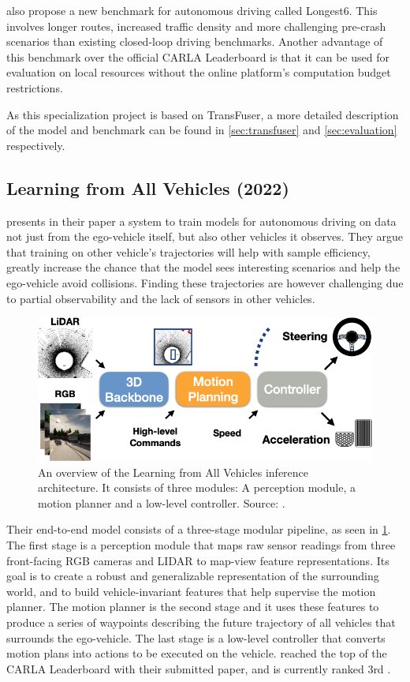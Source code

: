 \textcite{transfuser-pami} also propose a new benchmark for autonomous driving called Longest6. This involves longer routes, increased traffic density and more challenging pre-crash scenarios than existing closed-loop driving benchmarks. Another advantage of this benchmark over the official CARLA Leaderboard is that it can be used for evaluation on local resources without the online platform's computation budget restrictions.

As this specialization project is based on TransFuser, a more detailed description of the model and benchmark can be found in \cref{sec:transfuser} and \cref{sec:evaluation} respectively.


\subsection{Learning from All Vehicles (2022)}
\textcite{chen2022lav} presents in their paper a system to train models for autonomous driving on data not just from the ego-vehicle itself, but also other vehicles it observes.
They argue that training on other vehicle's trajectories will help with sample efficiency, greatly increase the chance that the model sees interesting scenarios and help the ego-vehicle avoid collisions. Finding these trajectories are however challenging due to partial observability and the lack of sensors in other vehicles.

\begin{figure}[htbp]
    \centering
    \includegraphics[width=.7\textwidth]{chapters/2-background/figures/lav.png}
    \caption{An overview of the Learning from All Vehicles inference architecture. It consists of three modules: A perception module, a motion planner and a low-level controller. Source: \cite{chen2022lav}.}
    \label{fig:lav}
\end{figure}

Their end-to-end model consists of a three-stage modular pipeline, as seen in \cref{fig:lav}. The first stage is a perception module that maps raw sensor readings from three front-facing RGB cameras and LIDAR to map-view feature representations. Its goal is to create a robust and generalizable representation of the surrounding world, and to build vehicle-invariant features that help supervise the motion planner. The motion planner is the second stage and it uses these features to produce a series of waypoints describing the future trajectory of all vehicles that surrounds the ego-vehicle. The last stage is a low-level controller that converts motion plans into actions to be executed on the vehicle. \textcite{chen2022lav} reached the top of the CARLA Leaderboard with their submitted paper, and is currently ranked 3rd \cite{chen2022lav, pwc-carla}.


